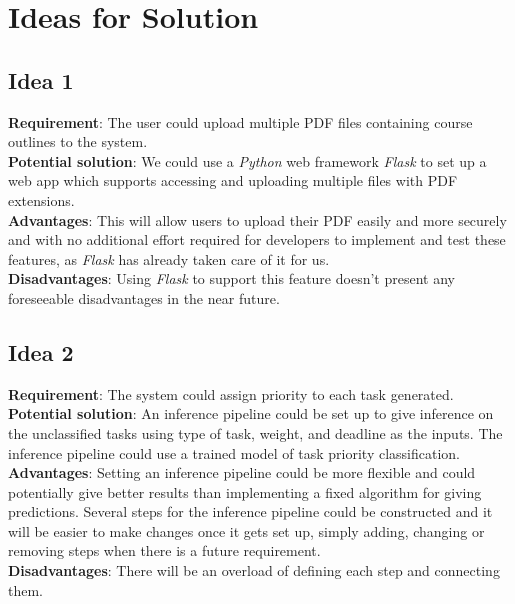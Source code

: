 \documentclass[12pt]{article}
\begin{document}
\section{Ideas for Solution}
\subsection{Idea 1}
\textbf{Requirement}: The user could upload multiple PDF files containing course outlines to the system. \\
\textbf{Potential solution}: We could use a \textit{Python} web framework \textit{Flask} to set up a web app which supports accessing and uploading multiple files with PDF extensions.\\
\textbf{Advantages}: This will allow users to upload their PDF easily and more securely and with no additional effort required for developers to implement and test these features, as \textit{Flask} has already taken care of it for us.\\
\textbf{Disadvantages}: Using \textit{Flask} to support this feature doesn't present any foreseeable disadvantages in the near future. \\

\subsection{Idea 2}
\textbf{Requirement}: The system could assign priority to each task generated. \\
\textbf{Potential solution}: An inference pipeline could be set up to give inference on the unclassified tasks using type of task, weight, and deadline as the inputs. The inference pipeline could use a trained model of task priority classification.\\
\textbf{Advantages}: Setting an inference pipeline could be more flexible and could potentially give better results than implementing a fixed algorithm for giving predictions. Several steps for the inference pipeline could be constructed and it will be easier to make changes once it gets set up, simply adding, changing or removing steps when there is a future requirement.\\
\textbf{Disadvantages}: There will be an overload of defining each step and connecting them. \\
\end{document}
